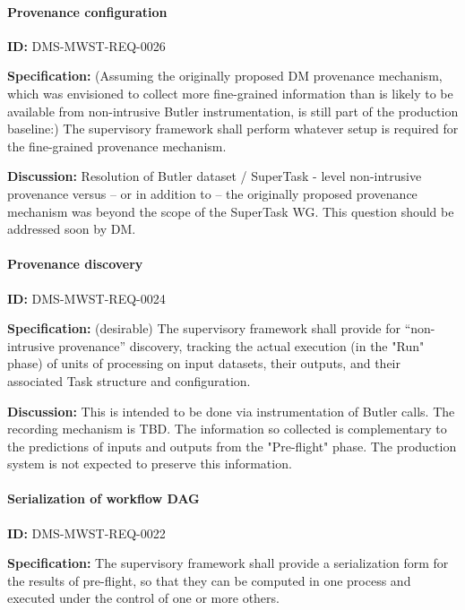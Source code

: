 \documentclass[SE,toc,lsstdraft]{lsstdoc}
\begin{document}
\paragraph{Provenance configuration}\hfill  %

\label{DMS-MWST-REQ-0026}
\textbf{ID:} DMS-MWST-REQ-0026

\textbf{Specification:}
(Assuming the originally proposed DM provenance mechanism, which was envisioned to collect more fine-grained information than is likely to be available from non-intrusive Butler instrumentation, is still part of the production baseline:) The supervisory framework shall perform whatever setup is required for the fine-grained provenance mechanism.

\textbf{Discussion:}
Resolution of Butler dataset / SuperTask - level non-intrusive provenance versus – or in addition to – the originally proposed provenance mechanism was beyond the scope of the SuperTask WG. This question should be addressed soon by DM.

\paragraph{Provenance discovery}\hfill  %

\label{DMS-MWST-REQ-0024}
\textbf{ID:} DMS-MWST-REQ-0024

\textbf{Specification:}
(desirable) The supervisory framework shall provide for “non-intrusive provenance” discovery, tracking the actual execution (in the "Run" phase) of units of processing on input datasets, their outputs, and their associated Task structure and configuration.

\textbf{Discussion:}
This is intended to be done via instrumentation of Butler calls. The recording mechanism is TBD. The information so collected is complementary to the predictions of inputs and outputs from the "Pre-flight" phase. The production system is not expected to preserve this information.

\paragraph{Serialization of workflow DAG}\hfill  %

\label{DMS-MWST-REQ-0022}
\textbf{ID:} DMS-MWST-REQ-0022

\textbf{Specification:}
The supervisory framework shall provide a serialization form for the results of pre-flight, so that they can be computed in one process and executed under the control of one or more others.
\end{document}
